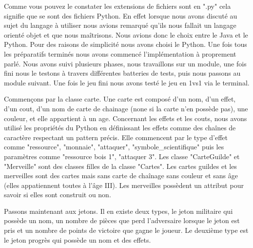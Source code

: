 \documentclass[a4paper, 12pt, french]{article}
\begin{document}
	Comme vous pouvez le constater les extensions de fichiers sont en ".py" cela signifie que se sont des fichiers
	Python. En effet lorsque nous avons discuté au sujet du langage à utiliser nous avions remarqué qu'ils nous fallait un
	langage orienté objet et que nous maîtrisons. Nous avions donc le choix entre le Java et le Python.
	Pour des raisons de simplicité nous avons choisi le Python. Une fois tous les préparatifs terminés nous avons
	commencé l'implémentation à proprement parlé. Nous avons suivi plusieurs phases, nous travaillons sur
	un module, une fois fini nous le testons à travers différentes batteries de tests, puis nous passons
	au module suivant. Une fois le jeu fini nous avons testé le jeu en 1vs1 via le terminal.

	Commençons par la classe carte.
	Une carte est composé d'un nom, d'un effet, d'un cout, d'un nom de carte de chainage (none si la carte n'en possède
	pas), une couleur, et elle appartient à un age.
	Concernant les effets et les couts, nous avons utilisé les propriétés du Python en définissant les effets
	comme des chaînes de caractère respectant un pattern précis. Elle commencent par le type d'effet
	comme "ressource", "monnaie", "attaquer", "symbole\_scientifique" puis les paramètres comme
	"ressource bois 1", "attaquer 3".
	Les classe "CarteGuilde" et "Merveille" sont des classes filles de la classe "Cartes". Les cartes guildes
	et les merveilles sont des cartes
	mais sans carte de chaînage sans couleur et sans âge (elles appatiennent toutes à l'âge III). Les merveilles
	possèdent un attribut pour savoir si elles sont construit ou non.

	Passons maintenant aux jetons. Il en existe deux types, le jeton militaire qui possède un nom, un nombre de pièces
	que perd l'adversaire lorsque le jeton est pris et un nombre de points de victoire que gagne le joueur.
	Le deuxième type est le jeton progrès qui possède un nom et des effets.
\end{document}
